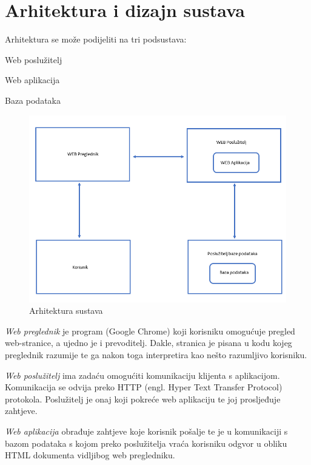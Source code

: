 \chapter{Arhitektura i dizajn sustava}
		

	\text Arhitektura se može podijeliti na tri podsustava:
	\begin{packed_item}
		\item Web poslužitelj
		\item Web aplikacija
		\item Baza podataka
	\end{packed_item}

    \begin{figure}[H]
    	\includegraphics[scale=0.58]{slike/Arhitektura sustava.png} %
    	\centering
    	\caption{Arhitektura sustava}
    	\label{ARH}
    \end{figure}

	 \textit{Web preglednik} je program (Google Chrome) koji korisniku omogućuje pregled web-stranice, a ujedno je i prevoditelj. Dakle, stranica je pisana u kodu kojeg preglednik razumije te ga nakon toga interpretira kao nešto razumljivo korisniku.
	 
	 
	 \textit{Web poslužitelj} ima zadaću omogućiti komunikaciju klijenta s aplikacijom. Komunikacija se odvija preko HTTP (engl. Hyper Text Transfer Protocol) protokola. 
	 Poslužitelj je onaj koji pokreće web aplikaciju te joj prosljeđuje zahtjeve.

	 
	 \textit{Web aplikacija} obrađuje zahtjeve koje korisnik pošalje te je u komunikaciji s bazom podataka s kojom preko poslužitelja vraća korisniku odgvor u obliku HTML dokumenta vidljibog web pregledniku.
	 
